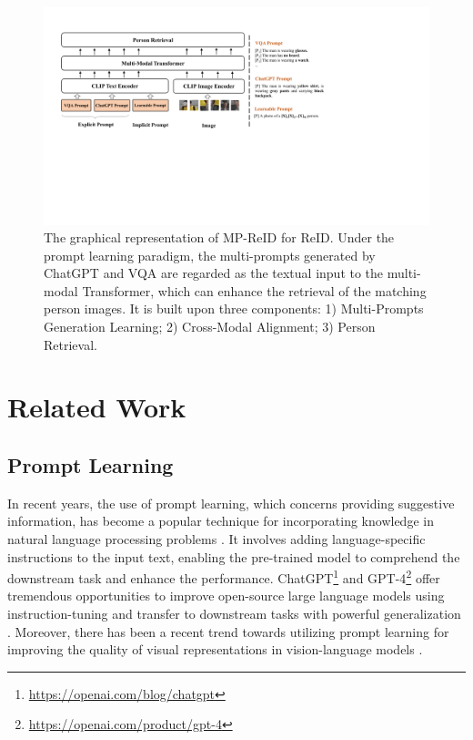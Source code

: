 \documentclass[letterpaper]{article} %
\begin{document}
\begin{figure}[t]
    \centering
    \includegraphics[width=\linewidth]{framework.pdf}
    \caption{The graphical representation of MP-ReID for ReID. Under the prompt learning paradigm, the multi-prompts generated by ChatGPT and VQA are regarded as the textual input to the multi-modal Transformer, which can enhance the retrieval of the matching person images. It is built upon three components: 1) Multi-Prompts Generation Learning; 2) Cross-Modal Alignment; 3) Person Retrieval.}
    \label{frameangel}
\end{figure}

\section{Related Work}
\subsection{Prompt Learning}

In recent years, the use of prompt learning, which concerns providing suggestive information, has become a popular technique for incorporating knowledge in natural language processing problems \cite{petroni2019language, song2022v2p,jin2023domain}. It involves adding language-specific instructions to the input text, enabling the pre-trained model to comprehend the downstream task and enhance the performance. ChatGPT\footnote{\url{https://openai.com/blog/chatgpt}} and GPT-4\footnote{\url{https://openai.com/product/gpt-4}} offer tremendous opportunities to improve open-source large language models using instruction-tuning \cite{peng2023instruction} and transfer to downstream tasks with powerful generalization \cite{zhang2023one}. Moreover, there has been a recent trend towards utilizing prompt learning for improving the quality of visual representations in vision-language models \cite{ju2022prompting, rao2022denseclip}.
\end{document}
